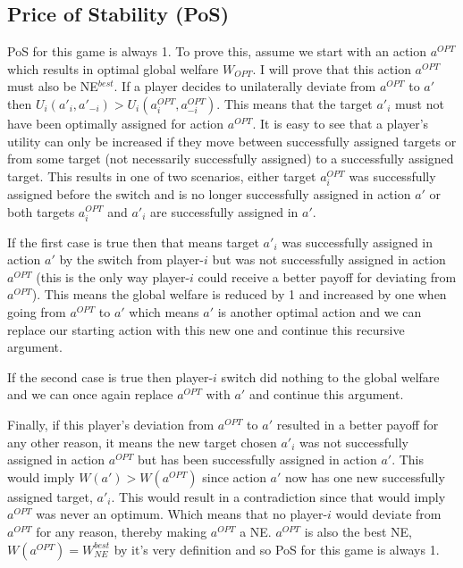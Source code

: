 \documentclass[11pt, onecolumn, compsoc, letterpaper]{article}
\begin{document}
\subsection{Price of Stability (PoS)}
PoS for this game is always 1. To prove this, assume we start with an action $a^{OPT}$ which results in optimal global welfare $W_{OPT}$. I will prove that this action $a^{OPT}$ must also be NE$^{best}$. If a player decides to unilaterally deviate from $a^{OPT}$ to $a'$ then $U_i(a'_i, a'_{-i}) > U_i(a^{OPT}_i, a^{OPT}_{-i})$. This means that the target $a'_i$ must not have been optimally assigned for action $a^{OPT}$. It is easy to see that a player's utility can only be increased if they move between successfully assigned targets or from some target (not necessarily successfully assigned) to a successfully assigned target. This results in one of two scenarios, either target $a^{OPT}_i$ was successfully assigned before the switch and is no longer successfully assigned in action $a'$ or both targets $a^{OPT}_i$ and $a'_i$ are successfully assigned in $a'$. 

If the first case is true then that means target $a'_i$ was successfully assigned in action $a'$ by the switch from player-$i$ but was not successfully assigned in action $a^{OPT}$ (this is the only way player-$i$ could receive a better payoff for deviating from $a^{OPT}$). This means the global welfare is reduced by 1 and increased by one when going from $a^{OPT}$ to $a'$ which means $a'$ is another optimal action and we can replace our starting action with this new one and continue this recursive argument.

If the second case is true then player-$i$ switch did nothing to the global welfare and we can once again replace $a^{OPT}$ with $a'$ and continue this argument.

Finally, if this player's deviation from $a^{OPT}$ to $a'$ resulted in a better payoff for any other reason, it means the new target chosen $a'_i$ was not successfully assigned in action $a^{OPT}$ but has been successfully assigned in action $a'$. This would imply $W(a') > W(a^{OPT})$ since action $a'$ now has one new successfully assigned target, $a'_i$. This would result in a contradiction since that would imply $a^{OPT}$ was never an optimum. Which means that no player-$i$ would deviate from $a^{OPT}$ for any reason, thereby making $a^{OPT}$ a NE. $a^{OPT}$ is also the best NE, $W(a^{OPT}) = W_{NE}^{best}$ by it's very definition and so PoS for this game is always 1.

\end{document}
